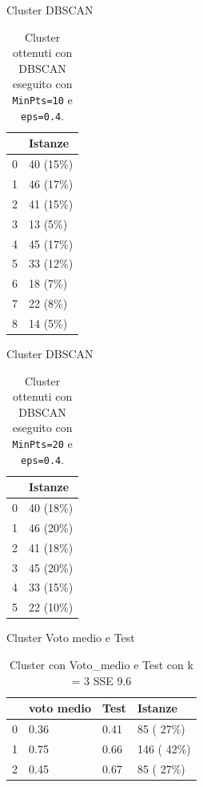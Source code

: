 \documentclass{beamer}
\begin{document}
\begin{frame}{Cluster DBSCAN}
  \begin{table}[H]
    \centering
    \begin{tabular}{@{}ll@{}}
    \toprule
                            & Istanze    \\ \midrule
    \multicolumn{1}{l}{0}   & 40 (15\%)  \\ 
    \multicolumn{1}{l}{1}   & 46 (17\%)  \\ 
    \multicolumn{1}{l}{2}   & 41 (15\%)  \\ 
    \multicolumn{1}{l}{3}   & 13 (5\%)   \\ 
    \multicolumn{1}{l}{4}   & 45 (17\%)  \\ 
    \multicolumn{1}{l}{5}   & 33 (12\%)  \\ 
    \multicolumn{1}{l}{6}   & 18 (7\%)   \\ 
    \multicolumn{1}{l}{7}   & 22 (8\%)   \\ 
    \multicolumn{1}{l}{8}   & 14 (5\%)   \\ \bottomrule
    \end{tabular}
    \caption{Cluster ottenuti con DBSCAN eseguito con \texttt{MinPts=10} e \texttt{eps=0.4}.}
    \end{table}
\end{frame}

\begin{frame}{Cluster DBSCAN}
  \begin{table}[H]
    \centering
    \begin{tabular}{@{}ll@{}}
    \toprule
                            & Istanze  \\ \midrule
    \multicolumn{1}{l}{0} & 40 (18\%) \\
    \multicolumn{1}{l}{1} & 46 (20\%) \\
    \multicolumn{1}{l}{2} & 41 (18\%) \\
    \multicolumn{1}{l}{3} & 45 (20\%) \\
    \multicolumn{1}{l}{4} & 33 (15\%) \\
    \multicolumn{1}{l}{5} & 22 (10\%) \\ \bottomrule
    \end{tabular}
    \caption{Cluster ottenuti con DBSCAN eseguito con \texttt{MinPts=20} e \texttt{eps=0.4}.}
    \end{table}
\end{frame}

\begin{frame}{Cluster Voto medio e Test}
  \begin{table}[ht]
    \centering
    \begin{tabular}{@{}llll@{}}
    \toprule
      & voto medio & Test  & Istanze\\ \midrule
    0 & 0.36       & 0.41  & 85  ( 27\%)\\
    1 & 0.75       & 0.66  & 146 ( 42\%)\\
    2 & 0.45       & 0.67  & 85  ( 27\%)\\ \bottomrule
    \end{tabular}
    \caption{Cluster con Voto\_medio e Test con k = 3 SSE 9.6}
    \label{c3MT}
  \end{table}
\end{frame}
\end{document}
